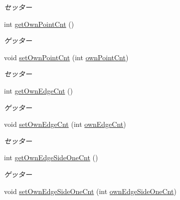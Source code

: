 \begin{DoxyCompactItemize}
\begin{DoxyCompactList}\small\item\em セッター \end{DoxyCompactList}\item 
int \hyperlink{classjp_1_1gr_1_1java__conf_1_1yuta__yoshinaga_1_1reversi_1_1model_1_1_reversi_anz_a3579aecd3696d9d48da7940422a03dc9}{get\+Own\+Point\+Cnt} ()
\begin{DoxyCompactList}\small\item\em ゲッター \end{DoxyCompactList}\item 
void \hyperlink{classjp_1_1gr_1_1java__conf_1_1yuta__yoshinaga_1_1reversi_1_1model_1_1_reversi_anz_a61316f0f4b113c2c86cd0a7e12f26dfe}{set\+Own\+Point\+Cnt} (int \hyperlink{classjp_1_1gr_1_1java__conf_1_1yuta__yoshinaga_1_1reversi_1_1model_1_1_reversi_anz_a2c74b625a020a63ed93a78f5d3bcc09e}{own\+Point\+Cnt})
\begin{DoxyCompactList}\small\item\em セッター \end{DoxyCompactList}\item 
int \hyperlink{classjp_1_1gr_1_1java__conf_1_1yuta__yoshinaga_1_1reversi_1_1model_1_1_reversi_anz_a478f8cab83e2562a8cf5d21a3d37d142}{get\+Own\+Edge\+Cnt} ()
\begin{DoxyCompactList}\small\item\em ゲッター \end{DoxyCompactList}\item 
void \hyperlink{classjp_1_1gr_1_1java__conf_1_1yuta__yoshinaga_1_1reversi_1_1model_1_1_reversi_anz_a6003ce46230d00dee3f83489000f1942}{set\+Own\+Edge\+Cnt} (int \hyperlink{classjp_1_1gr_1_1java__conf_1_1yuta__yoshinaga_1_1reversi_1_1model_1_1_reversi_anz_a83b975e4158e340ba2b27e6a96a38ad2}{own\+Edge\+Cnt})
\begin{DoxyCompactList}\small\item\em セッター \end{DoxyCompactList}\item 
int \hyperlink{classjp_1_1gr_1_1java__conf_1_1yuta__yoshinaga_1_1reversi_1_1model_1_1_reversi_anz_a34f79865c9078313104180bd228984be}{get\+Own\+Edge\+Side\+One\+Cnt} ()
\begin{DoxyCompactList}\small\item\em ゲッター \end{DoxyCompactList}\item 
void \hyperlink{classjp_1_1gr_1_1java__conf_1_1yuta__yoshinaga_1_1reversi_1_1model_1_1_reversi_anz_a637da35cb4ecce8e7b33c1d96b483a0e}{set\+Own\+Edge\+Side\+One\+Cnt} (int \hyperlink{classjp_1_1gr_1_1java__conf_1_1yuta__yoshinaga_1_1reversi_1_1model_1_1_reversi_anz_a8dfeaf41aa8dfc7faf994c2696868d36}{own\+Edge\+Side\+One\+Cnt})

\end{DoxyCompactItemize}
